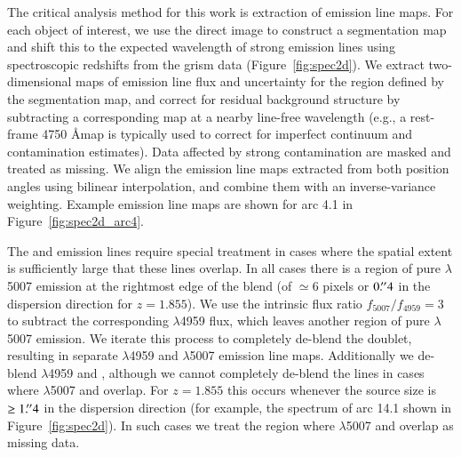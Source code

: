 The critical analysis method for this work is extraction of emission line maps. For each object of interest, we
use the direct image to construct a segmentation map and shift this to the expected wavelength of strong emission
lines using spectroscopic redshifts from the grism data (Figure~\ref{fig:spec2d}). We extract two-dimensional
maps of emission line flux and uncertainty for the region defined by the segmentation map, and correct for
residual background structure by subtracting a corresponding map at a nearby line-free wavelength (e.g., a
rest-frame 4750 \AA map is typically used to correct \Hb for imperfect continuum and contamination estimates).
Data affected by strong contamination are masked and treated as missing. We align the emission line maps
extracted from both position angles using bilinear interpolation, and combine them with an inverse-variance
weighting. Example emission line maps are shown for arc 4.1 in Figure~\ref{fig:spec2d_arc4}.

The \Hb and \OIII emission lines require special treatment in cases where  the spatial extent is sufficiently
large that these lines overlap. In all cases there is a region of pure \OIII $\lambda$5007 emission at the
rightmost edge of the blend (of $\simeq 6$ pixels or $0\mbox{$.\!^{\prime\prime}$}4$ in the dispersion direction for $z=1.855$). We
use the intrinsic flux ratio $f_{5007}/f_{4959} = 3$ to subtract the corresponding \OIII $\lambda$4959 flux,
which leaves another region of pure \OIII $\lambda$5007 emission. We iterate this process to completely de-blend
the \OIII doublet, resulting in separate $\lambda$4959 and $\lambda$5007 emission line maps. Additionally we
de-blend \OIII $\lambda$4959 and \Hb, although we cannot completely de-blend the lines in cases where \OIII
$\lambda$5007 and \Hb overlap. For $z=1.855$ this occurs whenever the source size is $\geq 1\mbox{$.\!^{\prime\prime}$}4$ in the
dispersion direction (for example, the spectrum of arc 14.1 shown in Figure~\ref{fig:spec2d}). In such cases we
treat the region where \OIII $\lambda$5007 and \Hb overlap as missing data.

